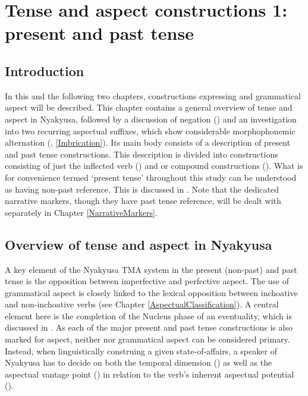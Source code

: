 \chapter{Tense and aspect constructions 1: present and past tense}\label{TenseAspectConstructions}
\largerpage
\section{Introduction}
In this and the following two chapters, constructions expressing  and grammatical aspect will be described. This chapter contains a general overview of tense and aspect in Nyakyusa, followed by a discussion of negation () and an investigation into two recurring aspectual suffixes, which show considerable morphophonemic alternation (, \ref{Imbrication}). Its main body consists of a description of present and past tense constructions. This description is divided into constructions consisting of just the inflected verb () and  or compound constructions (). What is for convenience termed \lq present tense' throughout this study can be understood as having non-past reference. This is discussed in . Note that the dedicated narrative markers, though they have past tense reference, will be dealt with separately in Chapter \ref{NarrativeMarkers}.

\section{Overview of tense and aspect in Nyakyusa}
A key element of the Nyakyusa TMA system in the present (non-past) and past tense is the opposition between imperfective and perfective aspect. The use of grammatical aspect is closely linked to the lexical opposition between inchoative and non-inchoative verbs (see Chapter \ref{AspectualClassification}). A central element here is the completion of the Nucleus phase of an eventuality, which is discussed in .  As each of the major present and past tense constructions is also marked for aspect, neither  nor grammatical aspect can be considered primary. Instead, when linguistically construing  a given state-of-affairs, a speaker of Nyakyusa has to decide on both the temporal dimension () as well as the aspectual vantage point () in relation to the verb's inherent aspectual potential ().

